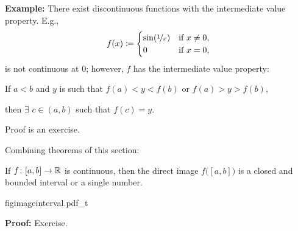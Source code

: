 \documentclass[10pt,aspectratio=169]{beamer}
\begin{document}
\begin{frame}

\textbf{Example:}
There exist discontinuous functions with
the intermediate value property.
\pause
E.g.,
\begin{equation*}
f(x) \coloneqq
\begin{cases}
\sin(\nicefrac{1}{x}) & \text{if } x \not= 0, \\
0 & \text{if } x=0,
\end{cases}
\end{equation*}
is not continuous at $0$; however, $f$ has the intermediate value property:

\pause
\medskip

If $a < b$ and $y$ is such that $f(a) < y < f(b)$ or $f(a) > y > f(b)$,

then $\exists$ $c \in (a,b)$ such that $f(c) = y$.

\pause
\medskip

Proof is an exercise.
\end{frame}

\begin{frame}

Combining theorems of this section:

\begin{corollary}
If $f \colon [a,b] \to {\mathbb{R}}$ is continuous, then the direct image
$f\bigl([a,b]\bigr)$
is a closed and bounded interval or a single number.
\end{corollary}

\pause
\begin{center}
{figimageinterval.pdf_t}
\end{center}

\pause
\textbf{Proof:} Exercise.

\end{frame}
\end{document}
